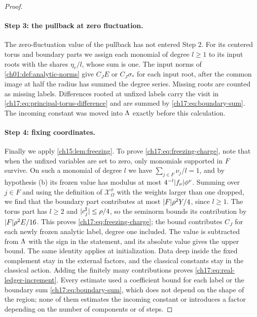 \begin{proof}
\paragraph{Step 3: the pullback at zero fluctuation.}
The zero-fluctuation value of the pullback has not entered Step 2. For its centered torus and boundary parts we assign each monomial of degree $l\ge1$ to its input roots with the shares $\eta_e/l$, whose sum is one. The input norms of \cref{ch01:def:analytic-norms} give $C_JE$ or $C_J\sigma_*$ for each input root, after the common image at half the radius has summed the degree series. Missing roots are counted as missing labels. Differences rooted at unfixed labels carry the visit in \eqref{ch17:eq:principal-torus-difference} and are summed by \eqref{ch17:eq:boundary-sum}. The incoming constant was moved into $\Lambda$ exactly before this calculation.

\paragraph{Step 4: fixing coordinates.}
Finally we apply \cref{ch15:lem:freezing}. To prove \eqref{ch17:eq:freezing-charge}, note that when the unfixed variables are set to zero, only monomials supported in $F$ survive. On such a monomial of degree $l$ we have $\sum_{j\in F}\nu_j/l=1$, and by hypothesis (b) its frozen value has modulus at most $4^{-l}\lvert f_\nu\rvert\phi^\nu$. Summing over $j\in F$ and using the definition of $\mathcal X^\phi_\Omega$ with the weights larger than one dropped, we find that the boundary part contributes at most $\lvert F\rvert\rho^2Y/4$, since $l\ge1$. The torus part has $l\ge2$ and $\lvert c^\sharp_j\rvert\le\rho/4$, so the seminorm bounds its contribution by $\lvert F\rvert\rho^2E/16$. This proves \eqref{ch17:eq:freezing-charge}; the bound contributes $C_J$ for each newly frozen analytic label, degree one included. The value is subtracted from $\Lambda$ with the sign in the statement, and its absolute value gives the upper bound. The same identity applies at initialization. Data deep inside the fixed complement stay in the external factors, and the classical constants stay in the classical action. Adding the finitely many contributions proves \eqref{ch17:eq:real-ledger-increment}. Every estimate used a coefficient bound for each label or the boundary sum \eqref{ch17:eq:boundary-sum}, which does not depend on the shape of the region; none of them estimates the incoming constant or introduces a factor depending on the number of components or of steps.
\end{proof}


